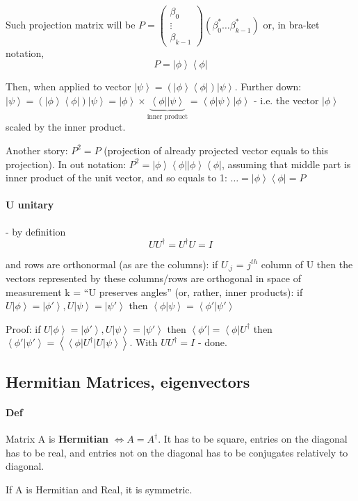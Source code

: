 \documentclass{scrartcl}
\newcommand{\ket}[1]{\left| #1 \right>} %
\newcommand{\bra}[1]{\left< #1 \right|} %
\newcommand{\braket}[2]{\left< #1 | #2 \right>} %
\begin{document}
Such projection matrix will be $P=\begin{pmatrix} \beta_0 \\ \vdots \\
  \beta_{k-1}\end{pmatrix} (\beta_0^* \dots \beta_{k-1}^*)$ or, in bra-ket
notation, $$P=\ket\phi \bra\phi$$

Then, when applied to vector $\ket\psi = (\ket\phi\bra\phi)\ket\psi$. Further
down: $\ket\psi = (\ket\phi\bra\phi)\ket\psi = \ket\phi \times
\underbrace{\bra\phi\ket\psi}_{\text{inner product}} = \braket\phi\psi \ket\phi$
- i.e. the vector $\ket\phi$ scaled by the inner product.

Another story: $P^2 = P$ (projection of already projected vector equals to this
projection). In out notation: $P^2 = \ket\phi \bra\phi \ket\phi \bra\phi$,
assuming that middle part is inner product of the unit vector, and so equals to
1: $\ldots = \ket\phi\bra\phi = P$

\paragraph{U unitary} - by definition $$U U^\dag = U^\dag U = I$$

and rows are orthonormal (as are the columns): if $U_{.j}$ = $j^{th}$ column of
U then the vectors represented by these columns/rows are orthogonal in space of
measurement k = ``U preserves angles'' (or, rather, inner products): if
$U\ket\phi = \ket{\phi'}, U\ket\psi = \ket{\psi'}$ then
$\braket\phi\psi=\braket{\phi'}{\psi'}$

Proof: if $U\ket\phi = \ket{\phi'}, U\ket\psi = \ket{\psi'}$ then $\bra{\phi'}
=\bra\phi U^\dag$ then $\braket{\phi'}{\psi'} = \braket{\bra\phi U^\dag}{U
  \ket\psi}$. With $U U^\dag = I$ - done.

\subsection{Hermitian Matrices, eigenvectors}
\label{sec:7-3}

\paragraph{Def} Matrix A is {\bf Hermitian} $\Leftrightarrow A=A^\dag$. It has
to be square, entries on the diagonal has to be real, and entries not on the
diagonal has to be conjugates relatively to diagonal.

If A is Hermitian and Real, it is symmetric.
\end{document}
